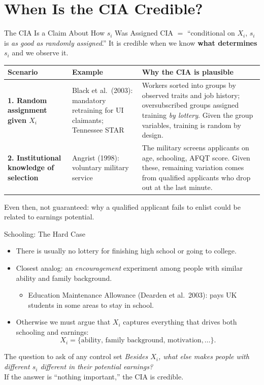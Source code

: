 \documentclass[aspectratio=169,11pt]{beamer}
\begin{document}
\section{When Is the CIA Credible?}
\begin{frame}{The CIA Is a Claim About How $s_i$ Was Assigned}
\small
CIA $=$ ``conditional on $X_i$, $s_i$ is \emph{as good as randomly assigned}.''
It is credible when we know \textbf{what determines $s_i$} and we observe it.
\medskip
\renewcommand{\arraystretch}{1.25}
\begin{tabular}{@{}L{2.6cm}L{5.0cm}L{5.4cm}@{}}
\toprule
\textbf{Scenario} & \textbf{Example} & \textbf{Why the CIA is plausible}\\
\midrule
\textbf{1. Random assignment given $X_i$}
& Black et al.\ (2003): mandatory retraining for UI claimants; Tennessee STAR
& Workers sorted into groups by observed traits and job history; oversubscribed groups assigned training \emph{by lottery}. Given the group variables, training is random by design.\\
\textbf{2. Institutional knowledge of selection}
& Angrist (1998): voluntary military service
& The military screens applicants on age, schooling, AFQT score. Given these, remaining variation comes from qualified applicants who drop out at the last minute.\\
\bottomrule
\end{tabular}

\smallskip
\alert{Even then, not guaranteed:} why a qualified applicant fails to enlist could be related to earnings potential.
\end{frame}

\begin{frame}{Schooling: The Hard Case}
\small
\begin{itemize}
\setlength{\itemsep}{0.45em}
\item There is usually \alert{no lottery} for finishing high school or going to college.
\item Closest analog: an \emph{encouragement} experiment among people with similar ability and family background.
\begin{itemize}
\item Education Maintenance Allowance (Dearden et al.\ 2003): pays UK students in some areas to stay in school.
\end{itemize}
\item Otherwise we must argue that $X_i$ captures everything that drives both schooling and earnings:
\[
X_i=\{\text{ability, family background, motivation},\dots\}.
\]
\end{itemize}
\medskip
\begin{block}{The question to ask of any control set}
\centering
\textit{Besides $X_i$, what else makes people with different $s_i$ different in their potential earnings?}\\[0.2em]
If the answer is ``nothing important,'' the CIA is credible.
\end{block}
\end{frame}
\end{document}
